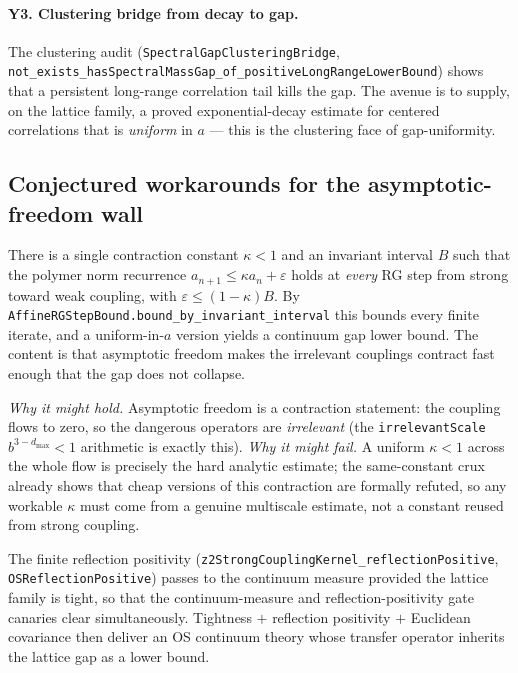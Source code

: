 \paragraph{Y3. Clustering bridge from decay to gap.} The clustering audit
(\verb|SpectralGapClusteringBridge|,
\verb|not_exists_hasSpectralMassGap_of_positiveLongRangeLowerBound|) shows that a
persistent long-range correlation tail kills the gap. The avenue is to supply,
on the lattice family, a proved exponential-decay estimate for centered
correlations that is \emph{uniform} in $a$ --- this is the clustering face of
gap-uniformity.

\subsection{Conjectured workarounds for the asymptotic-freedom wall}

\begin{conjecture}
\label{conj:ym-rg}
There is a single contraction constant $\kappa<1$ and an invariant interval $B$
such that the polymer norm recurrence
$a_{n+1}\le\kappa a_n+\varepsilon$ holds at \emph{every} RG step from strong
toward weak coupling, with $\varepsilon\le(1-\kappa)B$. By
\verb|AffineRGStepBound.bound_by_invariant_interval| this bounds every finite
iterate, and a uniform-in-$a$ version yields a continuum gap lower bound. The
content is that asymptotic freedom makes the irrelevant couplings contract fast
enough that the gap does not collapse.
\end{conjecture}

\noindent\emph{Why it might hold.} Asymptotic freedom is a contraction
statement: the coupling flows to zero, so the dangerous operators are
\emph{irrelevant} (the \verb|irrelevantScale| $b^{3-d_{\max}}<1$ arithmetic is
exactly this). \emph{Why it might fail.} A uniform $\kappa<1$ across the whole
flow is precisely the hard analytic estimate; the same-constant crux already
shows that cheap versions of this contraction are formally refuted, so any
workable $\kappa$ must come from a genuine multiscale estimate, not a constant
reused from strong coupling.

\begin{conjecture}
\label{conj:ym-rp-limit}
The finite reflection positivity (\verb|z2StrongCouplingKernel_reflectionPositive|,
\verb|OSReflectionPositive|) passes to the continuum measure provided the
lattice family is tight, so that the continuum-measure and reflection-positivity
gate canaries clear simultaneously. Tightness $+$ reflection positivity
$+$ Euclidean covariance then deliver an OS continuum theory whose transfer
operator inherits the lattice gap as a lower bound.
\end{conjecture}

